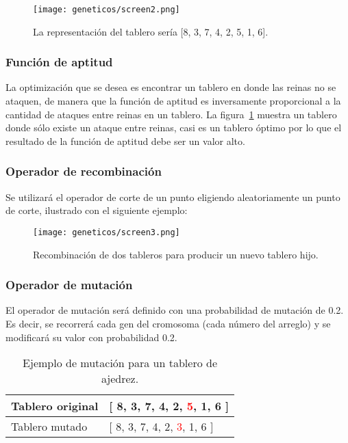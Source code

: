\begin{figure}[H]
  \centering
  \texttt{[image: geneticos/screen2.png]}
  \caption{La representación del tablero sería [8, 3, 7, 4, 2, 5, 1, 6].}
  \label{fig:P8screen2}
\end{figure}


\subsubsection{Funci\'on de aptitud}\par

La optimización que se desea es encontrar un tablero en donde las reinas no se ataquen, de manera que la función de aptitud es inversamente proporcional a la cantidad de ataques entre reinas en un tablero.
La figura~\ref{fig:P8screen2} muestra un tablero donde sólo existe un ataque entre reinas, casi es un tablero óptimo por lo que el resultado de la función de aptitud debe ser un valor alto.

\subsubsection{Operador de recombinaci\'on}

Se utilizará el operador de corte de un punto eligiendo aleatoriamente un punto de corte, ilustrado con el siguiente ejemplo:

\begin{figure}[H]
  \centering
  \texttt{[image: geneticos/screen3.png]}
  \caption{Recombinación de dos tableros para producir un nuevo tablero hijo.}
\end{figure}


\subsubsection{Operador de mutaci\'on}

El operador de mutación será definido con una probabilidad de mutación de 0.2. Es decir, se recorrerá cada gen del cromosoma (cada número del arreglo) y se modificará su valor con probabilidad 0.2.

\begin{table}[H]
  \centering
  \begin{tabular}{|l|l|}
  \hline
  Tablero original & {[} 8, 3, 7, 4, 2, \textcolor{red}{5}, 1, 6 {]}  \\ \hline
  Tablero mutado   & {[} 8, 3, 7, 4, 2, \textcolor{red}{3}, 1, 6 {]}  \\ \hline
  \end{tabular}
  \caption{Ejemplo de mutación para un tablero de ajedrez.}
\end{table}

